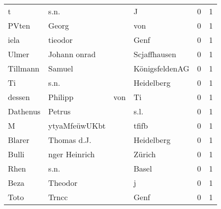 \begin{center}
\begin{tiny}
\begin{longtabu}{llllrr}
                        t &                               s.n. &             &                                           J &          0 &         1 \\
                    PVten &                              Georg &             &                                         von &          0 &         1 \\
                     iela &                            tieodor &             &                                        Genf &          0 &         1 \\
                    Ulmer &                       Johann onrad &             &                                Scjaffhausen &          0 &         1 \\
                 Tillmann &                             Samuel &             &                              KönigsfeldenAG &          0 &         1 \\
                       Ti &                               s.n. &             &                                  Heidelberg &          0 &         1 \\
                   dessen &                            Philipp &         von &                                          Ti &          0 &         1 \\
                 Dathenus &                             Petrus &             &                                        s.l. &          0 &         1 \\
                        M &                      ytyaMfeüwUKbt &             &                                       tfifb &          0 &         1 \\
                   Blarer &                        Thomas d.J. &             &                                  Heidelberg &          0 &         1 \\
                    Bulli &                      nger Heinrich &             &                                      Zürich &          0 &         1 \\
                     Rhen &                               s.n. &             &                                       Basel &          0 &         1 \\
                     Beza &                            Theodor &             &                                           j &          0 &         1 \\
                     Toto &                              Trncc &             &                                        Genf &          0 &         1 \\

\end{longtabu}
\end{tiny}
\end{center}
